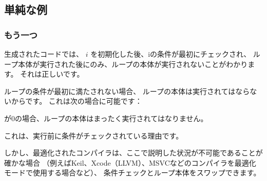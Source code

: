 ﻿\subsection{単純な例}





\subsubsection{もう一つ}

生成されたコードでは、 
$i$ を初期化した後、iの条件が最初にチェックされ、
ループ本体が実行された後にのみ、ループの本体が実行されないことがわかります。 
それは正しいです。

ループの条件が最初に満たされない場合、
ループの本体は実行されてはならないからです。
これは次の場合に可能です：



が0の場合、ループの本体はまったく実行されてはなりません。

これは、実行前に条件がチェックされている理由です。

しかし、最適化されたコンパイラは、ここで説明した状況が不可能であることが確かな場合
（例えばKeil、Xcode（LLVM）、MSVCなどのコンパイラを最適化モードで使用する場合など）、
条件チェックとループ本体をスワップできます。
